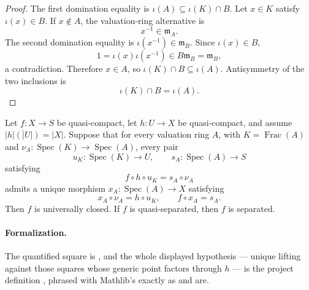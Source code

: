 \begin{proof}
  The first domination equality is
  $\iota(A)\subseteq\iota(K)\cap B$.  Let $x\in K$ satisfy $\iota(x)\in B$.
  If $x\notin A$, the valuation-ring alternative is
  \[
    x^{-1}\in\mathfrak m_A.
  \]
  The second domination equality is
  $\iota(x^{-1})\in\mathfrak m_B$.  Since $\iota(x)\in B$,
  \[
    1=\iota(x)\iota(x^{-1})\in B\mathfrak m_B=\mathfrak m_B,
  \]
  a contradiction.  Therefore $x\in A$, so
  $\iota(K)\cap B\subseteq\iota(A)$.  Antisymmetry of the two inclusions is
  \[
    \iota(K)\cap B=\iota(A).
  \]
\end{proof}

\begin{lemma}
  \label{lemma:nagata-dense-source-valuative}
  \leanok

  Let $f\colon X\to S$ be quasi-compact, let $h\colon U\to X$ be quasi-compact,
  and assume
  $\overline{|h|(|U|)}=|X|$.  Suppose that for every valuation ring $A$,
  with $K=\operatorname{Frac}(A)$ and
  $\nu_A\colon\operatorname{Spec}(K)\to\operatorname{Spec}(A)$, every pair
  \[
    u_K\colon\operatorname{Spec}(K)\to U,
    \qquad
    s_A\colon\operatorname{Spec}(A)\to S
  \]
  satisfying
  \[
    f\circ h\circ u_K=s_A\circ\nu_A
  \]
  admits a unique morphism
  $x_A\colon\operatorname{Spec}(A)\to X$ satisfying
  \[
    x_A\circ\nu_A=h\circ u_K,
    \qquad
    f\circ x_A=s_A.
  \]
  Then $f$ is universally closed.  If $f$ is quasi-separated, then $f$ is
  separated.

  \paragraph{Formalization.}
  The quantified square is
  \texttt{}, and the whole
  displayed hypothesis --- unique lifting against those squares whose generic
  point factors through $h$ --- is the project definition
  \texttt{}, phrased with
  Mathlib's \texttt{} exactly as
  \texttt{} and
  \texttt{} are.


\end{lemma}
